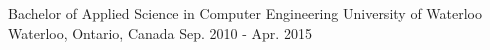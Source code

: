 

\begin{cventries}

  \cventry
    {Bachelor of Applied Science in Computer Engineering} %
    {University of Waterloo} %
    {Waterloo, Ontario, Canada} %
    {Sep. 2010 - Apr. 2015} %
    {
    }

\end{cventries}
